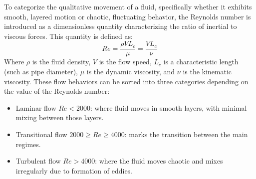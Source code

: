 
To categorize the qualitative movement of a fluid, specifically whether it exhibits smooth, layered motion or chaotic, fluctuating behavior, the Reynolds number is introduced as a dimensionless quantity characterizing the ratio of inertial to viscous forces.
This quantity is defined as:
\begin{equation}
	Re = \frac{\rho V L_c}{\mu} = \frac{V L_c}{\nu}
	\label{eq:reynolds-number}
\end{equation}
Where $\rho$ is the fluid density, $V$ is the flow speed, $L_c$ is a characteristic length (such as pipe diameter), $\mu$ is the dynamic viscosity, and $\nu$ is the kinematic viscosity.
These flow behaviors can be sorted into three categories depending on the value of the Reynolds number:
\begin{itemize}
	\item Laminar flow $Re < 2000$: where fluid moves in smooth layers, with minimal mixing between those layers.
	\item Transitional flow $2000 \ge Re \ge 4000$: marks the transition between the main regimes.
	\item Turbulent flow $Re > 4000$: where the fluid moves chaotic and mixes irregularly due to formation of eddies.
\end{itemize}
\cite{Cengel2017, anderson2021modern}

